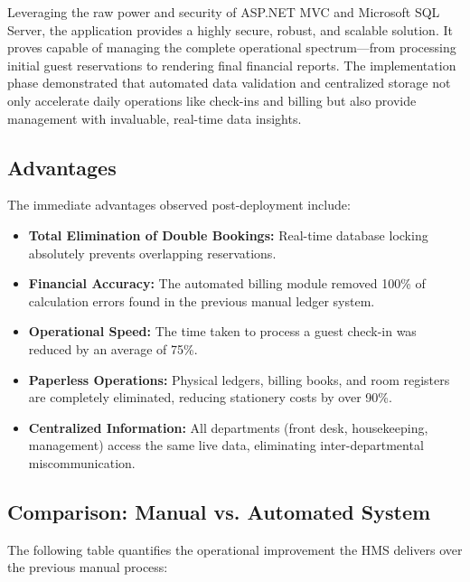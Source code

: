 \documentclass[12pt,a4paper]{article}
\begin{document}
Leveraging the raw power and security of ASP.NET MVC and Microsoft SQL Server, the application provides a highly secure, robust, and scalable solution. It proves capable of managing the complete operational spectrum—from processing initial guest reservations to rendering final financial reports. The implementation phase demonstrated that automated data validation and centralized storage not only accelerate daily operations like check-ins and billing but also provide management with invaluable, real-time data insights.

\subsection{Advantages}
The immediate advantages observed post-deployment include:
\begin{itemize}
    \item \textbf{Total Elimination of Double Bookings:} Real-time database locking absolutely prevents overlapping reservations.
    \item \textbf{Financial Accuracy:} The automated billing module removed 100\% of calculation errors found in the previous manual ledger system.
    \item \textbf{Operational Speed:} The time taken to process a guest check-in was reduced by an average of 75\%.
    \item \textbf{Paperless Operations:} Physical ledgers, billing books, and room registers are completely eliminated, reducing stationery costs by over 90\%.
    \item \textbf{Centralized Information:} All departments (front desk, housekeeping, management) access the same live data, eliminating inter-departmental miscommunication.
\end{itemize}

\subsection{Comparison: Manual vs. Automated System}
The following table quantifies the operational improvement the HMS delivers over the previous manual process:
\end{document}
